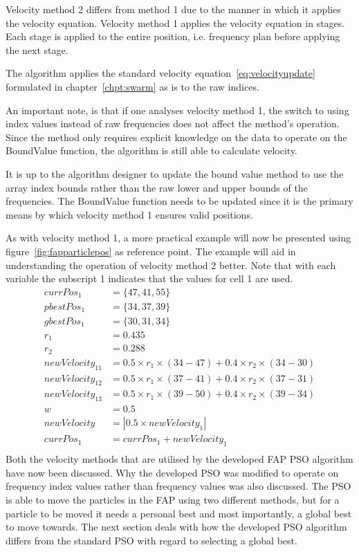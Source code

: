 Velocity method 2 differs from method 1 due to the manner in which it applies the velocity equation. Velocity method 1 applies the velocity equation in stages. Each stage is applied to the entire position, i.e. frequency plan before applying the next stage. 

The algorithm applies the standard velocity equation~\ref{eq:velocityupdate} formulated in chapter~\ref{chpt:swarm} as is to the raw indices.

An important note, is that if one analyses velocity method 1, the switch to using index values instead of raw frequencies does not affect the method's operation. Since the method only requires explicit knowledge on the data to operate on the BoundValue function, the algorithm is still able to calculate velocity. 

It is up to the algorithm designer to update the bound value method to use the array index bounds rather than the raw lower and upper bounds of the frequencies. The BoundValue function needs to be updated since it is the primary means by which velocity method 1 ensures valid positions.

As with velocity method 1, a more practical example will now be presented using figure~\ref{fig:fapparticlepos} as reference point. The example will aid in understanding the operation of velocity method 2 better. Note that with each variable the subscript 1 indicates that the values for cell 1 are used.
\begin{align}
    currPos_1 &= \{47,41,55\}\nonumber \\
    pbestPos_1 &= \{34,37,39\}\nonumber \\
    gbestPos_1 &= \{30, 31,34\}\nonumber \\
    r_1 &= 0.435\nonumber \\
    r_2 &= 0.288\nonumber \\
    newVelocity_{11} &= 0.5 \times r_1 \times (34 - 47) + 0.4 \times r_2 \times (34 - 30)\nonumber \\
    newVelocity_{12} &= 0.5 \times r_1 \times (37 - 41) + 0.4 \times r_2 \times (37 - 31)\nonumber \\
    newVelocity_{13} &= 0.5 \times r_1 \times (39 - 50) + 0.4 \times r_2 \times (39 - 34)\nonumber \\
    w &= 0.5\nonumber \\
    newVelocity &= |0.5 \times newVelocity_1|\nonumber \\
    currPos_1 &= currPos_1 + newVelocity_1\nonumber \\
\end{align}
Both the velocity methods that are utilised by the developed \gls{FAP} \gls{PSO} algorithm have now been discussed. Why the developed \gls{PSO} was modified to operate on frequency index values rather than frequency values was also discussed. The \gls{PSO} is able to move the particles in the \gls{FAP} using two different methods, but for a particle to be moved it needs a personal best and most importantly, a global best to move towards. The next section deals with how the developed \gls{PSO} algorithm differs from the standard \gls{PSO} with regard to selecting a global best.
